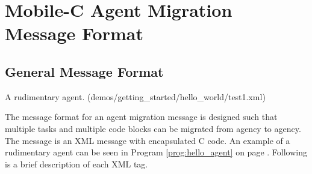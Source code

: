 \documentclass[11pt]{report}
\begin{document}
\chapter{Mobile-C Agent Migration Message Format}
\section{General Message Format \label{sec:gen_message_format}}
\begin{Program}
\begin{center}
   {\scriptsize \linespread{1.0} }
\end{center}
\caption{A rudimentary agent. (demos/getting\_started/hello\_world/test1.xml)}
\label{prog:hello_agent}
\end{Program}
The message format for an agent migration message is designed such that
multiple tasks and multiple code blocks can be migrated from agency to
agency. The message is an XML message with encapsulated C code. An example
of a rudimentary agent can be seen in Program \ref{prog:hello_agent} on 
page \pageref{prog:hello_agent}. 
Following is a brief description of each XML tag.
\end{document}
